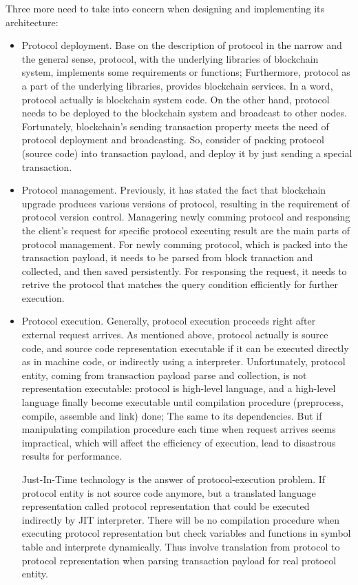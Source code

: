 \documentclass[sigplan,screen]{acmart}
\begin{document}
Three more need to take into concern when designing and implementing its
architecture:
\begin{itemize}
  \item Protocol deployment. Base on the description of protocol in the narrow
    and the general sense, protocol, with the underlying libraries of
    blockchain system, implements some requirements or functions; Furthermore,
    protocol as a part of the underlying libraries, provides blockchain services.
    In a word, protocol actually is blockchain system code. On the other hand,
    protocol needs to be deployed to the blockchain system and broadcast to
    other nodes. Fortunately, blockchain's sending transaction property meets
    the need of protocol deployment and broadcasting. So, consider of packing
    protocol (source code) into transaction payload, and deploy it by just
    sending a special transaction.
  \item Protocol management. Previously, it has stated the fact that blockchain
    upgrade produces various versions of protocol, resulting in the
    requirement of protocol version control. Managering newly comming protocol
    and responsing the client's request for specific protocol executing result
    are the main parts of protocol management. For newly comming protocol,
    which is packed into the transaction payload, it needs to be parsed from
    block tranaction and collected, and then saved persistently. For responsing
    the request, it needs to retrive the protocol that matches the query
    condition efficiently for further execution.
  \item Protocol execution. Generally, protocol execution proceeds right after external
    request arrives. As mentioned above, protocol actually is source code, and
    source code representation executable if it can be executed directly as in
    machine code, or indirectly using a interpreter. Unfortunately, protocol
    entity, coming from transaction payload parse and collection, is not
    representation executable: protocol is high-level language, and a
    high-level language finally become executable until compilation procedure
    (preprocess, compile, assemble and link) done; The same to its
    dependencies. But if manipulating compilation procedure each time when
    request arrives seems impractical, which will affect the efficiency of
    execution, lead to disastrous results for performance.

    Just-In-Time technology is the answer of protocol-execution problem. If
    protocol entity is not source code anymore, but a translated language
    representation called protocol representation that could be executed
    indirectly by JIT interpreter. There will be no compilation procedure when
    executing protocol representation but check variables and functions in
    symbol table and interprete dynamically. Thus involve translation from
    protocol to protocol representation when parsing transaction payload for
    real protocol entity.
\end{itemize}
\end{document}
